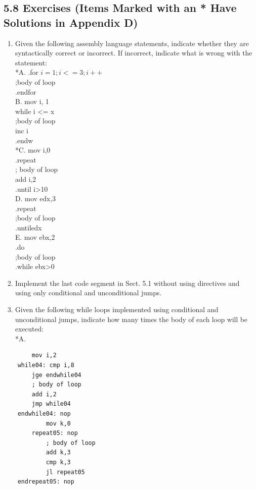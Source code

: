 \documentclass[10pt]{article}
\begin{document}
\subsection*{5.8 Exercises (Items Marked with an * Have Solutions in Appendix D)}
\begin{enumerate}
  \item Given the following assembly language statements, indicate whether they are syntactically correct or incorrect. If incorrect, indicate what is wrong with the statement:\\
*A. .for $i=1 ; i<=3 ; i++$\\
;body of loop\\
.endfor\\
B. mov i, 1\\
while i <= x\\
;body of loop\\
inc i\\
.endw\\
*C. mov i,0\\
.repeat\\
; body of loop\\
add i,2\\
.until i>10\\
D. mov edx,3\\
.repeat\\
;body of loop\\
.untiledx\\
E. mov ebx,2\\
.do\\
;body of loop\\
.while ebx>0
  \item Implement the last code segment in Sect. 5.1 without using directives and using only conditional and unconditional jumps.
  \item Given the following while loops implemented using conditional and unconditional jumps, indicate how many times the body of each loop will be executed:\\
*A.
\end{enumerate}

\begin{verbatim}
        mov i,2
    while04: cmp i,8
        jge endwhile04
        ; body of loop
        add i,2
        jmp while04
    endwhile04: nop
            mov k,0
        repeat05: nop
            ; body of loop
            add k,3
            cmp k,3
            jl repeat05
    endrepeat05: nop
\end{verbatim}
\end{document}
